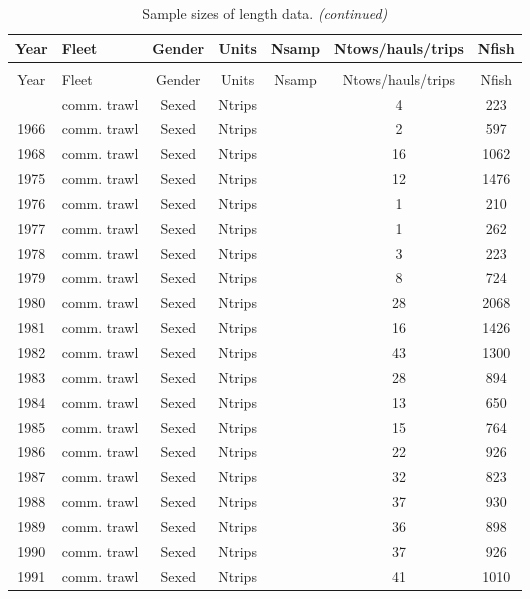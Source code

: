 \begingroup\fontsize{9}{11}\selectfont
\begingroup\fontsize{9}{11}\selectfont

\begin{longtable}[t]{c>{\centering\arraybackslash}p{3cm}ccccc}
\caption{\label{tab:sample-size-length}Sample sizes of length data.}\\
\toprule
Year & Fleet & Gender & Units & Nsamp & Ntows/hauls/trips & Nfish\\
\midrule
\endfirsthead
\caption[]{Sample sizes of length data. \textit{(continued)}}\\
\toprule
Year & Fleet & Gender & Units & Nsamp & Ntows/hauls/trips & Nfish\\
\midrule
\endhead

\endfoot
\bottomrule
\endlastfoot
1965 & comm. trawl & Sexed & Ntrips &  & 4 & 223\\
1966 & comm. trawl & Sexed & Ntrips &  & 2 & 597\\
1968 & comm. trawl & Sexed & Ntrips &  & 16 & 1062\\
1975 & comm. trawl & Sexed & Ntrips &  & 12 & 1476\\
1976 & comm. trawl & Sexed & Ntrips &  & 1 & 210\\
1977 & comm. trawl & Sexed & Ntrips &  & 1 & 262\\
1978 & comm. trawl & Sexed & Ntrips &  & 3 & 223\\
1979 & comm. trawl & Sexed & Ntrips &  & 8 & 724\\
1980 & comm. trawl & Sexed & Ntrips &  & 28 & 2068\\
1981 & comm. trawl & Sexed & Ntrips &  & 16 & 1426\\
1982 & comm. trawl & Sexed & Ntrips &  & 43 & 1300\\
1983 & comm. trawl & Sexed & Ntrips &  & 28 & 894\\
1984 & comm. trawl & Sexed & Ntrips &  & 13 & 650\\
1985 & comm. trawl & Sexed & Ntrips &  & 15 & 764\\
1986 & comm. trawl & Sexed & Ntrips &  & 22 & 926\\
1987 & comm. trawl & Sexed & Ntrips &  & 32 & 823\\
1988 & comm. trawl & Sexed & Ntrips &  & 37 & 930\\
1989 & comm. trawl & Sexed & Ntrips &  & 36 & 898\\
1990 & comm. trawl & Sexed & Ntrips &  & 37 & 926\\
1991 & comm. trawl & Sexed & Ntrips &  & 41 & 1010\\

\end{longtable}
